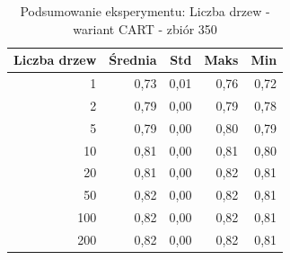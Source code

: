 \begin{table}[htbp]
\centering
\small
\setlength{\tabcolsep}{6pt}
\renewcommand{\arraystretch}{1.2}
\caption{Podsumowanie eksperymentu: Liczba drzew - wariant CART - zbiór 350}
\label{tab:CART_tree_count_350}
\begin{tabular}{r|r|r|r|r}
\toprule
Liczba drzew & Średnia & Std & Maks & Min \\
\hline
1 & 0,73 & 0,01 & 0,76 & 0,72 \\
2 & 0,79 & 0,00 & 0,79 & 0,78 \\
5 & 0,79 & 0,00 & 0,80 & 0,79 \\
10 & 0,81 & 0,00 & 0,81 & 0,80 \\
20 & 0,81 & 0,00 & 0,82 & 0,81 \\
50 & 0,82 & 0,00 & 0,82 & 0,81 \\
100 & 0,82 & 0,00 & 0,82 & 0,81 \\
200 & 0,82 & 0,00 & 0,82 & 0,81 \\
\bottomrule
\end{tabular}
\end{table}